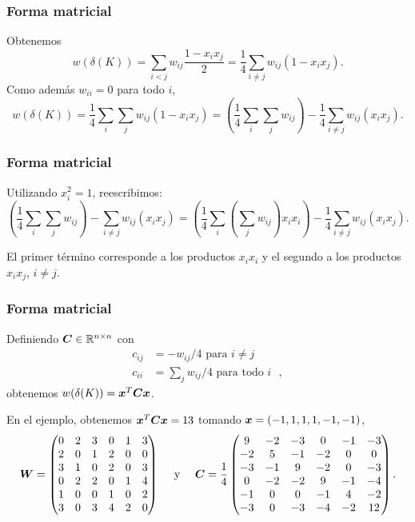 \documentclass[aspectratio=169,12pt,spanish]{beamer}
\begin{document}

\begin{frame}
\frametitle{Forma matricial}

Obtenemos
$$
w(\delta(K)) = \sum_{i < j}w_{ij}\frac{1-x_i x_j}{2} = \frac{1}{4}\sum_{i \neq j}w_{ij}(1-x_i x_j).
$$
Como además $w_{ii} = 0$ para todo $i$,
$$
w(\delta(K)) = \frac{1}{4}\sum_i \sum_j w_{ij}(1-x_i x_j) = \left(\frac{1}{4}\sum_i \sum_j w_{ij} \right) - \frac{1}{4} \sum_{i \neq j}w_{ij}(x_i x_j).
$$


\end{frame}


\begin{frame}
\frametitle{Forma matricial}

Utilizando $x_i^2 = 1$, reescribimos:
$$
\left(\frac{1}{4}\sum_i \sum_j w_{ij} \right) - \sum_{i \neq j}w_{ij}(x_i x_j) = \left(\frac{1}{4}\sum_i \left(\sum_j w_{ij}\right) x_i x_i \right) - \frac{1}{4} \sum_{i \neq j}w_{ij}(x_i x_j).
$$

El primer término corresponde a los productos $x_i x_i$ y el segundo a los productos $x_i x_j$, $i \neq j$.

\end{frame}


\begin{frame}
\frametitle{Forma matricial}

Definiendo $\bm{C} \in \mathbb{R}^{n \times n}$ con
\begin{align*}
  c_{ij} &= -w_{ij}/4  \text{ para $i \neq j$}  \\
  c_{ii} &= \sum_j w_{ij}/4 \text{ para todo $i$ },
\end{align*}
obtenemos $w(\delta(K)) = \bm{x}^T \bm{C} \bm{x}$.

En el ejemplo, obtenemos $\bm{x}^T \bm{C} \bm{x} = 13$ tomando $\bm{x} = (-1, 1, 1, 1, -1, -1)$,
$$
\bm{W} = \begin{pmatrix}
0 & 2 & 3 & 0 & 1 & 3 \\
2 & 0 & 1 & 2 & 0 & 0 \\
3 & 1 & 0 & 2 & 0 & 3 \\
0 & 2 & 2 & 0 & 1 & 4 \\
1 & 0 & 0 & 1 & 0 & 2 \\
3 & 0 & 3 & 4 & 2 & 0
\end{pmatrix}
\quad \text{ y }\quad
\bm{C} = \frac{1}{4} \begin{pmatrix}
9 & -2 & -3 & 0 & -1 & -3 \\
-2 & 5 & -1 & -2 & 0 & 0 \\
-3 & -1 & 9 & -2 & 0 & -3 \\
0 & -2 & -2 & 9 & -1 & -4 \\
-1 & 0 & 0 & -1 & 4 & -2 \\
-3 & 0 & -3 & -4 & -2 & 12
\end{pmatrix}.
$$


\end{frame}
\end{document}
